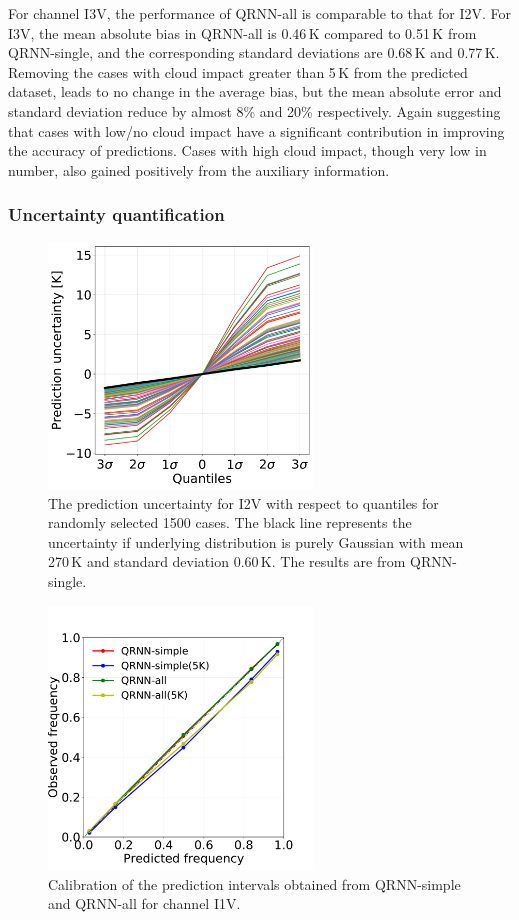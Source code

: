 \documentclass[amt, manuscript]{copernicus}
\begin{document}
For channel I3V, the performance of QRNN-all is comparable to that for I2V. For I3V, the mean absolute bias in QRNN-all is 0.46\,K compared to 0.51\,K from QRNN-single, and the corresponding standard deviations are 0.68\,K and 0.77\,K. Removing the cases with cloud impact greater than 5\,K from the predicted dataset, leads to no change in the average bias, but the mean absolute error and standard deviation reduce by almost  8\% and 20\% respectively. Again suggesting that cases with low/no cloud impact have a significant contribution in improving the accuracy of predictions. Cases with high cloud impact, though very low in number, also gained positively from the auxiliary information.  

\subsubsection{Uncertainty quantification}
\label{sec:prediction_uncertainty}
\begin{figure}[t]
	\includegraphics[width = 70mm]{Figures/prediction_uncertainty_I2V.pdf}	
	\caption{The prediction uncertainty  for I2V  with respect to quantiles for randomly selected 1500 cases. The black line represents the uncertainty if underlying distribution is purely Gaussian with mean 270\,K and standard deviation 0.60\,K. The results are from QRNN-single.}
	\label{fig:prediction_uncertainty_I2V}	
\end{figure}
\begin{figure}[t]
	\includegraphics[height = 70mm]{Figures/calibration_QRNN_I1V.pdf}	
	\caption{Calibration of the prediction intervals obtained from QRNN-simple and QRNN-all for channel I1V. }
	\label{fig:calibration_I1V}	
\end{figure}
\end{document}
